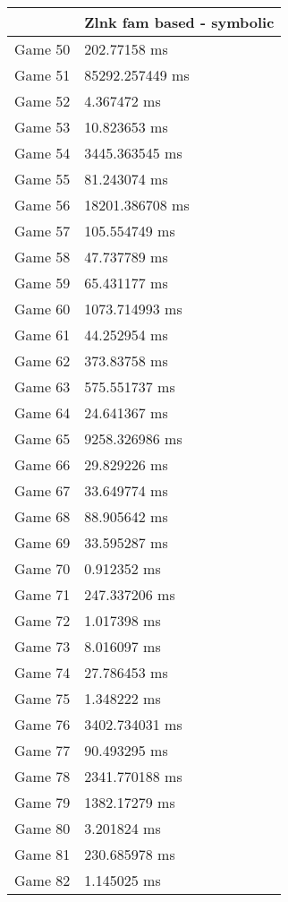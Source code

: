 \begin{tabular}{|l|l|}
	\hline
	& Zlnk fam based - symbolic \\ \hline
	Game 50 & 202.77158 ms \\ \hline
	Game 51 & 85292.257449 ms \\ \hline
	Game 52 & 4.367472 ms \\ \hline
	Game 53 & 10.823653 ms \\ \hline
	Game 54 & 3445.363545 ms \\ \hline
	Game 55 & 81.243074 ms \\ \hline
	Game 56 & 18201.386708 ms \\ \hline
	Game 57 & 105.554749 ms \\ \hline
	Game 58 & 47.737789 ms \\ \hline
	Game 59 & 65.431177 ms \\ \hline
	Game 60 & 1073.714993 ms \\ \hline
	Game 61 & 44.252954 ms \\ \hline
	Game 62 & 373.83758 ms \\ \hline
	Game 63 & 575.551737 ms \\ \hline
	Game 64 & 24.641367 ms \\ \hline
	Game 65 & 9258.326986 ms \\ \hline
	Game 66 & 29.829226 ms \\ \hline
	Game 67 & 33.649774 ms \\ \hline
	Game 68 & 88.905642 ms \\ \hline
	Game 69 & 33.595287 ms \\ \hline
	Game 70 & 0.912352 ms \\ \hline
	Game 71 & 247.337206 ms \\ \hline
	Game 72 & 1.017398 ms \\ \hline
	Game 73 & 8.016097 ms \\ \hline
	Game 74 & 27.786453 ms \\ \hline
	Game 75 & 1.348222 ms \\ \hline
	Game 76 & 3402.734031 ms \\ \hline
	Game 77 & 90.493295 ms \\ \hline
	Game 78 & 2341.770188 ms \\ \hline
	Game 79 & 1382.17279 ms \\ \hline
	Game 80 & 3.201824 ms \\ \hline
	Game 81 & 230.685978 ms \\ \hline
	Game 82 & 1.145025 ms \\ \hline

\end{tabular}
